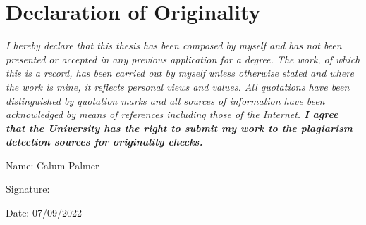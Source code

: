 

\section*{Declaration of Originality}\label{sec:declaration of originality}

\emph{I hereby declare that this thesis has been composed by myself and has not been
    presented or accepted in any previous application for a degree. The work, of which
    this is a record, has been carried out by myself unless otherwise stated and where
    the work is mine, it reflects personal views and values. All quotations have been
    distinguished by quotation marks and all sources of information have been
    acknowledged by means of references including those of the Internet.
    \textbf{I agree that the University has the right to submit my work to the plagiarism
    detection sources for originality checks.}}

\vspace{2cm}
        {\noindent\large Name: Calum Palmer}

\vspace{0.5cm}
{\noindent\large Signature: }

\vspace{0.5cm}
{\noindent\large Date: 07/09/2022}

\newpage